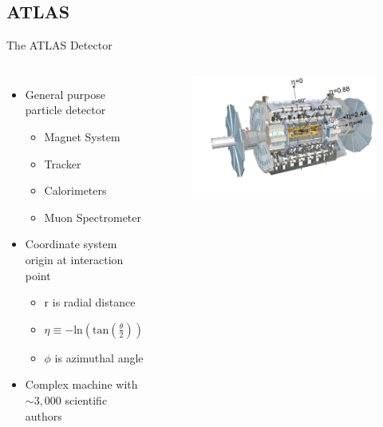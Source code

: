 \documentclass[aspectratio=169,xcolor=table]{beamer}
\begin{document}
  \subsection{ATLAS }

    \begin{frame}[t]{The ATLAS Detector}
      \begin{columns}[t]
        \begin{itemize}
          \item General purpose particle detector
            \begin{itemize}
              \item Magnet System
              \item Tracker
              \item Calorimeters
              \item Muon Spectrometer
            \end{itemize}
          \item Coordinate system origin at interaction point
          \begin{itemize}
            \item r is radial distance
            \item $\eta \equiv - \mathrm{ln}(\mathrm{tan}(\frac{\theta}{2}))$
            \item $\phi$ is azimuthal angle
          \end{itemize}
          \item Complex machine with $\sim3,000$ scientific authors
        \end{itemize}

        \begin{figure}
        \begin{centering}
        \includegraphics[width=\textwidth,keepaspectratio=true]{ATLAS_Full_Diagram.jpg}
        \end{centering}
        \caption{\tiny \cite{atlas-schematics} \cite{pseudorapidity}}
        \end{figure}
      \end{columns}
    \end{frame}
\end{document}
